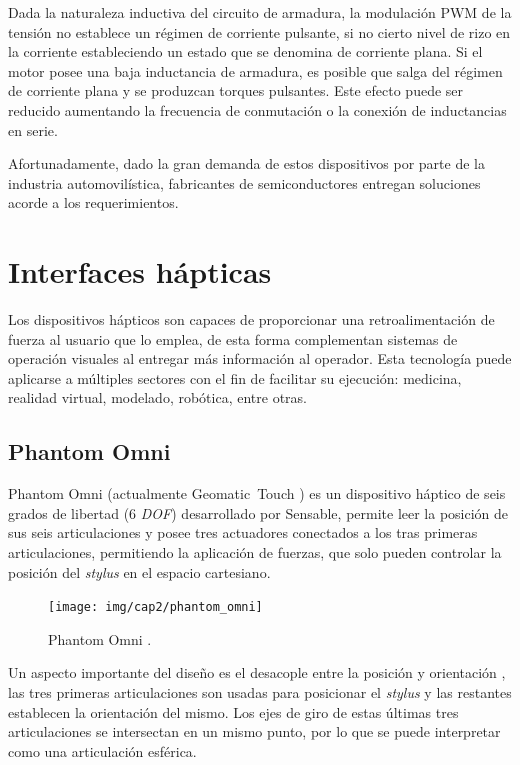 Dada la naturaleza inductiva del circuito de armadura, la modulación PWM de la tensión no establece un régimen de corriente pulsante, si no cierto nivel de rizo en la corriente estableciendo un estado que se denomina de corriente plana. Si el motor posee una baja inductancia de armadura, es posible que salga del régimen de corriente plana y se produzcan torques pulsantes. Este efecto puede ser reducido aumentando la frecuencia de conmutación o la conexión de inductancias en serie.

Afortunadamente, dado la gran demanda de estos dispositivos por parte de la industria automovilística, fabricantes de semiconductores entregan soluciones acorde a los requerimientos.

\section{Interfaces hápticas}

Los dispositivos hápticos son capaces de proporcionar una retroalimentación de fuerza al usuario que lo emplea, de esta forma complementan sistemas de operación visuales al entregar más información al operador. Esta tecnología puede aplicarse a múltiples sectores con el fin de facilitar su ejecución: medicina, realidad virtual, modelado, robótica, entre otras.

\subsection{Phantom Omni \texttrademark}

Phantom Omni \texttrademark (actualmente Geomatic\textregistered \, Touch \texttrademark) es un dispositivo háptico de seis grados de libertad (6 \textit{DOF}) desarrollado por Sensable\textregistered, permite leer la posición de sus seis articulaciones y posee tres actuadores conectados a los tras primeras articulaciones, permitiendo la aplicación de fuerzas, que solo pueden controlar la posición del \textit{stylus} en el espacio cartesiano.

\begin{figure}[ht]
  \centering
  \texttt{[image: img/cap2/phantom\_omni]}
  \caption{Phantom Omni \texttrademark.}
  \label{cap2_phantom}
\end{figure}

Un aspecto importante del diseño es el desacople entre la posición y orientación \cite{beckman2007}, las tres primeras articulaciones son usadas para posicionar el \textit{stylus} y las restantes establecen la orientación del mismo. Los ejes de giro de estas últimas tres articulaciones se intersectan en un mismo punto, por lo que se puede interpretar como una articulación esférica.

